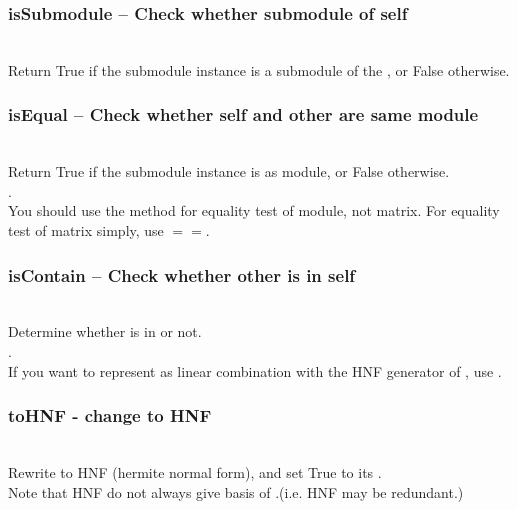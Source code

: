  \subsubsection{isSubmodule -- Check whether submodule of self}
   \\
   \spacing
   \quad Return True if the submodule instance is a submodule of the , or False otherwise.\\
   \spacing
   \subsubsection{isEqual -- Check whether self and other are same module}
   \\
   \spacing
   \quad Return True if the submodule instance is  as module, or False otherwise.\\.\\
   \spacing
   \quad You should use the method for equality test of module, not matrix.
   For equality test of matrix simply, use $==$.
   \\
   \subsubsection{isContain -- Check whether other is in self}
   \\
   \spacing
   \quad Determine whether  is in  or not.\\.\\
   \spacing
   \quad If you want to represent  as linear combination with the HNF generator of , use .
   \\
   \subsubsection{toHNF - change to HNF}
   \\
   \spacing
   \quad Rewrite  to HNF (hermite normal form), and set True to its .\\
   \spacing
   \quad Note that HNF do not always give basis of .(i.e. HNF may be redundant.)\\
   \spacing

